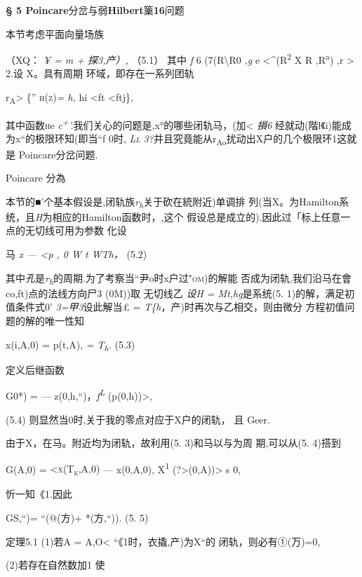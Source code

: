 \documentclass{article}
\begin{document}
\protect\hypertarget{bookmark86}{}{}\textbf{§ 5
Poincare}分岔与弱\textbf{Hilbert}篥\textbf{16}问题

本节考虑平面向量场族

（XQ： \emph{¥ = m + 探3,产）,} （5.1） 其中 \emph{f} 6
(7(R\textbackslash{}R0 \emph{,g} e \textless{}\^{}(R\textsuperscript{2}
X R ,R\textsuperscript{a}) ,r \textgreater{} 2.设 X。具有周期
环域，即存在一系列团轨

r\textsubscript{A}\textgreater{} \textsc{\{'' h(z)}\emph{= h,} hi
\textless{}ft \textless{}ftj\},

其中函数\textsc{h}e
\emph{c\textsuperscript{+}'.}我们关心的问题是,x°的哪些闭轨马，(加\textless{}
\emph{損6} 经就动(階l《i)能成为x``的极限环知(即当``f 0时,
\emph{\textsc{Ll
3?}}并且究竟能从r\textsubscript{Ao}扰动出X户的几个极限环1这就是
Poincare分岔问题.

Poincare 分為

本节的■'个基本假设是,闭轨族\emph{r\textsubscript{h}}关于砍在統附近)单调排
列(当X。为Hamilton系统，且\emph{H}为相应的Hamilton函数时，,这个
假设总是成立的).因此过「标上任意一点的无切线可用为参数 化设

马\textbar{} \emph{x --- \textless{}p , 0 W t WTh，} (5.2)

其中\emph{孔}是\emph{r\textsubscript{h}}的周期.为了考察当``尹o时x户过\textsc{"om)}的解能
否成为闭轨,我们沿马在會co,ft)点的法线方向尸3 (0M))取 无切线乙 \emph{设H
= Mt,hg}是系统(5. 1)的解，满足初值条件式0' \emph{3=甲3}设此解当£ =
\emph{T\{h}，产)时再次与乙相交，则由微分 方程初值问题的解的唯一性知

x(i,A,0) = p(t,A), \emph{= T\textsubscript{h}.} (5.3)

定义后继函数

G0*) = --- z(0,h,``)，\emph{f\textsuperscript{L}}
(p(0,h))\textgreater{},

(5.4) 则显然当0时,关于我的零点对应于X户的闭轨， 且 Geer.

由于X，在马。附近均为闭轨，故利用(5. 3)和马以与为周 期,可以从(5. 4)搭到

G(A,0) = \textsc{\textless{}x(T\textsubscript{k},A,0)} --- x(0,A,0),
X\textsuperscript{1} (?\textgreater{}(0,A))\textgreater{} s 0,

忻一知\textbar{}《1.因此

GS,``)= ``(@(方)+ *(方,``)). (5. 5)

定理5.1 (1)若A = A,O\textless{}
\textbar{}``\textbar{}《1时，衣撬,产)为X``的 闭轨，则必有①(万)=0,

(2)若存在自然数加1 使
\end{document}
